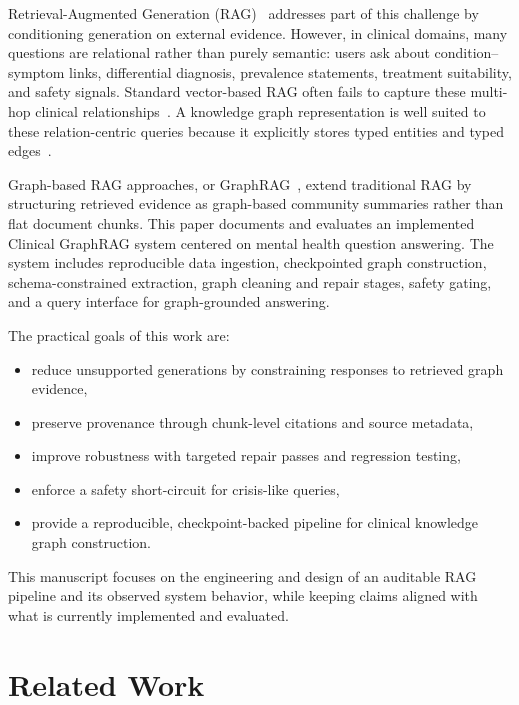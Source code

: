 \documentclass[12pt,a4paper]{article}
\begin{document}
Retrieval-Augmented Generation (RAG)~\cite{lewis2020rag, guu2020realm} addresses part of this challenge by conditioning generation on external evidence. However, in clinical domains, many questions are relational rather than purely semantic: users ask about condition--symptom links, differential diagnosis, prevalence statements, treatment suitability, and safety signals. Standard vector-based RAG often fails to capture these multi-hop clinical relationships~\cite{pan2024kgrag}. A knowledge graph representation is well suited to these relation-centric queries because it explicitly stores typed entities and typed edges~\cite{hogan2021kg}.

Graph-based RAG approaches, or GraphRAG~\cite{edge2024graphrag}, extend traditional RAG by structuring retrieved evidence as graph-based community summaries rather than flat document chunks. This paper documents and evaluates an implemented Clinical GraphRAG system centered on mental health question answering. The system includes reproducible data ingestion, checkpointed graph construction, schema-constrained extraction, graph cleaning and repair stages, safety gating, and a query interface for graph-grounded answering.

The practical goals of this work are:
\begin{itemize}[nosep]
    \item reduce unsupported generations by constraining responses to retrieved graph evidence,
    \item preserve provenance through chunk-level citations and source metadata,
    \item improve robustness with targeted repair passes and regression testing,
    \item enforce a safety short-circuit for crisis-like queries,
    \item provide a reproducible, checkpoint-backed pipeline for clinical knowledge graph construction.
\end{itemize}

This manuscript focuses on the engineering and design of an auditable RAG pipeline and its observed system behavior, while keeping claims aligned with what is currently implemented and evaluated.

\section{Related Work}
\end{document}
